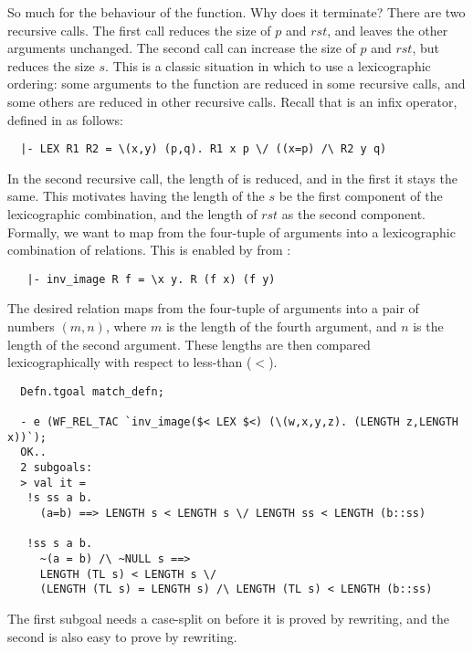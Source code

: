 So much for the behaviour of the function. Why does it terminate? There
are two recursive calls. The first call reduces the size of $p$ and $\mathit{rst}$, and
leaves the other arguments unchanged. The second call can increase the
size of $p$ and $\mathit{rst}$, but reduces the size $s$. This is a classic situation
in which to use a  lexicographic ordering: some arguments to the function are reduced in
some recursive calls, and some others are reduced in other recursive calls.
Recall that  is an infix operator, defined in  as follows:
%
\begin{hol}
\begin{verbatim}
  |- LEX R1 R2 = \(x,y) (p,q). R1 x p \/ ((x=p) /\ R2 y q)
\end{verbatim}
\end{hol}
%
In the second recursive call, the length of  is reduced, and in
the first it stays the same. This motivates having the length of the
$s$ be the first component of the lexicographic
combination, and the length of $\mathit{rst}$ as the second
component. Formally, we want to map from the four-tuple of
arguments into a lexicographic combination of relations.
This is enabled by  from :
%
\begin{hol}
\begin{verbatim}
   |- inv_image R f = \x y. R (f x) (f y)
\end{verbatim}
\end{hol}
%
The desired relation maps from the four-tuple of arguments into a pair
of numbers $(m,n)$, where $m$ is the length of the fourth argument, and
$n$ is the length of the second argument. These lengths are then
compared lexicographically with respect to less-than ($<$).
\begin{session}
\begin{verbatim}
  Defn.tgoal match_defn;

  - e (WF_REL_TAC `inv_image($< LEX $<) (\(w,x,y,z). (LENGTH z,LENGTH x))`);
  OK..
  2 subgoals:
  > val it =
   !s ss a b.
     (a=b) ==> LENGTH s < LENGTH s \/ LENGTH ss < LENGTH (b::ss)

   !ss s a b.
     ~(a = b) /\ ~NULL s ==>
     LENGTH (TL s) < LENGTH s \/
     (LENGTH (TL s) = LENGTH s) /\ LENGTH (TL s) < LENGTH (b::ss)
\end{verbatim}
\end{session}
%
The first subgoal needs a case-split on  before it is proved by
rewriting, and the second is also easy to prove by rewriting.

